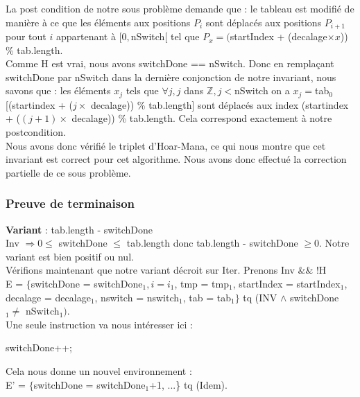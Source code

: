La post condition de notre sous problème demande que : le tableau est modifié de manière à ce que les éléments aux positions $P_{i}$ sont déplacés aux positions $P_{i+1}$ pour tout $i$ appartenant à $[0,$nSwitch[ tel que $P_{x} = ($startIndex + (decalage$\times x$)) \% tab.length.\\

Comme H est vrai, nous avons switchDone == nSwitch. Donc en remplaçant switchDone par nSwitch dans la dernière conjonction de notre invariant, nous savons que : les éléments $x_{j}$ tels que $\forall j, j$ dans $\mathbb{Z}, j<$nSwitch on a $x_{j}=$tab$_{0}$[(startindex + ($j\times$ decalage)) \% tab.length] sont déplacés aux index (startindex + ($(j+1)\times$ decalage)) \% tab.length. 
Cela correspond exactement à notre postcondition.\\

Nous avons donc vérifié le triplet d'Hoar-Mana, ce qui nous montre que cet invariant est correct pour cet algorithme. 
Nous avons donc effectué la correction partielle de ce sous problème. 


\subsubsection*{Preuve de terminaison}
\textbf{Variant}  : tab.length - switchDone\\

Inv $\Rightarrow 0 \leq$ switchDone $\leq$ tab.length donc tab.length - switchDone $\geq 0$. Notre variant est bien positif ou nul.\\ 

Vérifions maintenant que notre variant décroit sur Iter. Prenons Inv $\&\&$ !H \\

E = $\{ $switchDone = switchDone$_{1}, i = i_{1}$, tmp = tmp$_{1}$, startIndex = startIndex$_{1}$, decalage = decalage$_{1}$, nswitch = nswitch$_{1}$, tab = tab$_{1}\}$ tq (INV $\wedge$ switchDone$_{1} \neq$ nSwitch$_{1})$.\\

Une seule instruction va nous intéresser ici : 

\begin{center}
  switchDone++;\\
\end{center} 
 
Cela nous donne un nouvel environnement :\\

E' = $\{$switchDone = switchDone$_{1}$+1, ...\} tq (Idem).\newline

